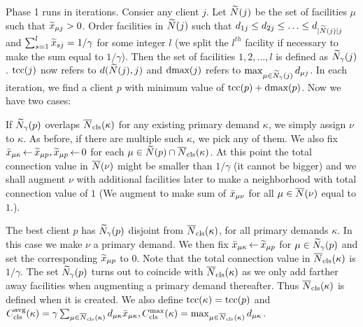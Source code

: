\documentclass[11pt]{article}
\begin{document}
Phase 1 runs in iterations. Consier any client $j$.  Let
${\widetilde N}(j)$ be the set of facilities $\mu$ such that
${\widetilde x}_{\mu j}>0$. Order facilities in ${\widetilde N}(j)$ such
that $d_{1 j} \leq d_{2 j} \leq \ldots \leq d_{|{\widetilde N}(j)|
  j}$ and $\sum_{s=1}^l {\widetilde x}_{s j} = 1/\gamma$ for some
integer $l$ (we split the $l^{th}$ facility if necessary to
make the sum equal to $1/\gamma$). Then the set of
facilities $1,2,\ldots,l$ is defined as
${\widetilde N}_{\gamma}(j)$. $\textrm{tcc}(j)$ now refers to
$d({\widetilde N}(j), j)$ and $\text{dmax}(j)$ refers to $\max_{\mu \in
  {\widetilde N}_{\gamma}(j)} d_{\mu j}$. In each iteration, we
find a client $p$ with minimum value of $\textrm{tcc}(p) +
\text{dmax}(p)$. Now we have two cases:

\smallskip
\noindent
{} If ${\widetilde N}_{\gamma}(p)$ overlaps
${\overline{N}}_{\text{cls}}(\kappa)$ for any existing primary
demand $\kappa$, we simply assign $\nu$ to $\kappa$. As
before, if there are multiple such $\kappa$, we pick any of
them. We also fix ${\bar x}_{\mu\kappa} {\,\leftarrow\,} {\widetilde x}_{\mu
  p}, {\widetilde x}_{\mu p}{\,\leftarrow\,} 0$ for each $\mu \in
{\widetilde N}(p)\cap {\overline{N}}_{\text{cls}}(\kappa)$. At this point
the total connection value in ${\overline{N}}(\nu)$ might be smaller
than $1/\gamma$ (it cannot be bigger) and we shall augment
$\nu$ with additional facilities later to make a
neighborhood with total connection value of $1$ (We
augment to make sum of ${\bar x}_{\mu\nu}$ for all
$\mu\in{\overline{N}}(\nu)$ equal to $1$.).

\smallskip
\noindent
{}
The best client $p$ has ${\widetilde N}_{\gamma}(p)$
disjoint from ${\overline{N}}_{\text{cls}}(\kappa)$, for all primary demands $\kappa$.
In this case we
make $\nu$ a primary demand. We then fix
${\bar x}_{\mu\kappa}{\,\leftarrow\,} {\widetilde x}_{\mu p}$ for $\mu \in
{\widetilde N}_{\gamma}(p)$ and set the corresponding
${\widetilde x}_{\mu p}$ to $0$.  Note that the total connection value in
${\overline{N}}_{\text{cls}}(\kappa)$ is $1/\gamma$.  The set
${\widetilde N}_{\gamma}(p)$ turns out to coincide with
${\overline{N}}_{\text{cls}}(\kappa)$ as we only add farther away facilities
when augmenting a primary demand thereafter. Thus
${\overline{N}}_{\text{cls}}(\kappa)$ is defined when it is created. We also
define $\textrm{tcc}(\kappa) = \textrm{tcc}(p)$ and
$C_{\text{cls}}^{{\mbox{\scriptsize\rm avg}}}(\kappa)=\gamma\sum_{\mu\in{\overline{N}}_{\text{cls}}(\kappa)}d_{\mu\kappa}{\bar x}_{\mu\kappa},
C_{\text{cls}}^{\max}(\kappa)=\max_{\mu\in{\overline{N}}_{\text{cls}}(\kappa)}d_{\mu\kappa}$.
\end{document}
